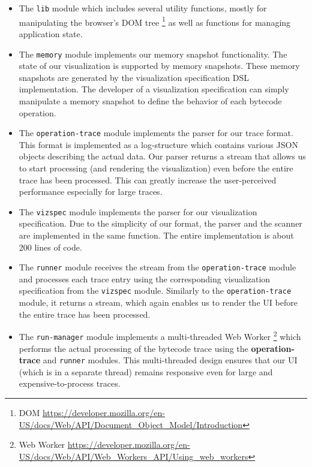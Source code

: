 \documentclass[conference]{IEEEtran}
\begin{document}
\begin{itemize}
    \item The \texttt{lib} module which includes several utility functions, mostly for manipulating the browser's DOM tree \footnote{DOM \url{https://developer.mozilla.org/en-US/docs/Web/API/Document_Object_Model/Introduction}} as well as functions for managing application state.

    \item The \texttt{memory} module implements our memory snapshot functionality. The state of our visualization is supported by memory snapshots. These memory snapshots are generated by the visualization specification DSL implementation. The developer of a visualization specification can simply manipulate a memory snapshot to define the behavior of each bytecode operation.


    \item The \texttt{operation-trace} module implements the parser for our trace format. This format is implemented as a log-structure which contains various JSON objects describing the actual data. Our parser returns a stream that allows us to start processing (and rendering the visualization) even before the entire trace has been processed. This can greatly increase the user-perceived performance especially for large traces.

    \item The \texttt{vizspec} module implements the parser for our visualization specification. Due to the simplicity of our format, the parser and the scanner are implemented in the same function. The entire implementation is about 200 lines of code.

    \item The \texttt{runner} module receives the stream from the \texttt{operation-trace} module and processes each trace entry using the corresponding visualization specification from the \texttt{vizspec} module. Similarly to the \texttt{operation-trace} module, it returns a stream, which again enables us to render the UI before the entire trace has been processed.

    \item The \texttt{run-manager} module implements a multi-threaded Web Worker \footnote{Web Worker \url{https://developer.mozilla.org/en-US/docs/Web/API/Web_Workers_API/Using_web_workers}} which performs the actual processing of the bytecode trace using the \textbf{operation-trace} and \texttt{runner} modules. This multi-threaded design ensures that our UI (which is in a separate thread) remains responsive even for large and expensive-to-process traces.


\end{itemize}
\end{document}
